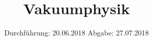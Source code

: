 

\subject{V70}
\title{Vakuumphysik}
\date{
  Durchführung: 20.06.2018
  \hspace{3em}
  Abgabe: 27.07.2018
}



\maketitle
\newpage

%
%


%


\appendix


\printbibliography


